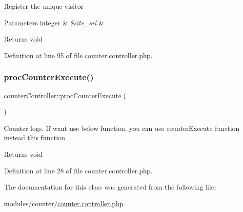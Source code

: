 Register the unique visitor


\begin{DoxyParams}[1]{Parameters}
integer & {\em \$site\+\_\+srl} & \\
\hline
\end{DoxyParams}
\begin{DoxyReturn}{Returns}
void 
\end{DoxyReturn}


Definition at line 95 of file counter.\+controller.\+php.

\mbox{\label{classcounterController_ab15b7e62975f84fb59f166e65eb79701}} 
\subsubsection{\texorpdfstring{proc\+Counter\+Execute()}{procCounterExecute()}}
{\footnotesize\ttfamily counter\+Controller\+::proc\+Counter\+Execute (\begin{DoxyParamCaption}{ }\end{DoxyParamCaption})}

Counter logs. If want use below function, you can use \textquotesingle{}counter\+Execute\textquotesingle{} function instead this function

\begin{DoxyReturn}{Returns}
void 
\end{DoxyReturn}


Definition at line 28 of file counter.\+controller.\+php.



The documentation for this class was generated from the following file\+:\begin{DoxyCompactItemize}
\item 
modules/counter/\hyperlink{counter_8controller_8php}{counter.\+controller.\+php}\end{DoxyCompactItemize}
